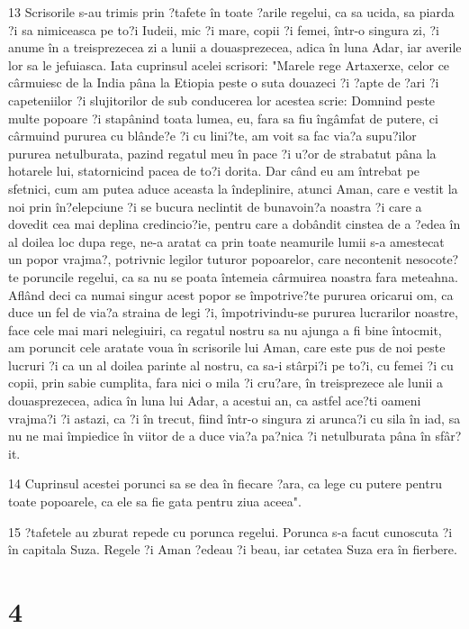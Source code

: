 \par 13 Scrisorile s-au trimis prin ?tafete în toate ?arile regelui, ca sa ucida, sa piarda ?i sa nimiceasca pe to?i Iudeii, mic ?i mare, copii ?i femei, într-o singura zi, ?i anume în a treisprezecea zi a lunii a douasprezecea, adica în luna Adar, iar averile lor sa le jefuiasca. Iata cuprinsul acelei scrisori: "Marele rege Artaxerxe, celor ce cârmuiesc de la India pâna la Etiopia peste o suta douazeci ?i ?apte de ?ari ?i capeteniilor ?i slujitorilor de sub conducerea lor acestea scrie: Domnind peste multe popoare ?i stapânind toata lumea, eu, fara sa fiu îngâmfat de putere, ci cârmuind pururea cu blânde?e ?i cu lini?te, am voit sa fac via?a supu?ilor pururea netulburata, pazind regatul meu în pace ?i u?or de strabatut pâna la hotarele lui, statornicind pacea de to?i dorita. Dar când eu am întrebat pe sfetnici, cum am putea aduce aceasta la îndeplinire, atunci Aman, care e vestit la noi prin în?elepciune ?i se bucura neclintit de bunavoin?a noastra ?i care a dovedit cea mai deplina credincio?ie, pentru care a dobândit cinstea de a ?edea în al doilea loc dupa rege, ne-a aratat ca prin toate neamurile lumii s-a amestecat un popor vrajma?, potrivnic legilor tuturor popoarelor, care necontenit nesocote?te poruncile regelui, ca sa nu se poata întemeia cârmuirea noastra fara meteahna. Aflând deci ca numai singur acest popor se împotrive?te pururea oricarui om, ca duce un fel de via?a straina de legi ?i, împotrivindu-se pururea lucrarilor noastre, face cele mai mari nelegiuiri, ca regatul nostru sa nu ajunga a fi bine întocmit, am poruncit cele aratate voua în scrisorile lui Aman, care este pus de noi peste lucruri ?i ca un al doilea parinte al nostru, ca sa-i stârpi?i pe to?i, cu femei ?i cu copii, prin sabie cumplita, fara nici o mila ?i cru?are, în treisprezece ale lunii a douasprezecea, adica în luna lui Adar, a acestui an, ca astfel ace?ti oameni vrajma?i ?i astazi, ca ?i în trecut, fiind într-o singura zi arunca?i cu sila în iad, sa nu ne mai împiedice în viitor de a duce via?a pa?nica ?i netulburata pâna în sfâr?it.
\par 14 Cuprinsul acestei porunci sa se dea în fiecare ?ara, ca lege cu putere pentru toate popoarele, ca ele sa fie gata pentru ziua aceea".
\par 15 ?tafetele au zburat repede cu porunca regelui. Porunca s-a facut cunoscuta ?i în capitala Suza. Regele ?i Aman ?edeau ?i beau, iar cetatea Suza era în fierbere.

\chapter{4}

